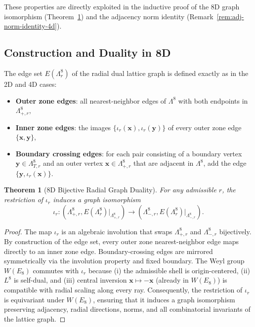 \documentclass{article}
\newtheorem{theorem}{Theorem}
\begin{document}
These properties are directly exploited in the inductive proof of the 8D graph isomorphism (Theorem~\ref{thm:8d-duality}) and the adjacency norm identity (Remark~\ref{rem:adj-norm-identity-4d}).

\subsection{Construction and Duality in 8D}
\label{subsec:8d-graph-construction-duality}
The edge set \(E(\Lambda_r^8)\) of the radial dual lattice graph is defined exactly as in the 2D and 4D cases:
\begin{itemize}
  \item \textbf{Outer zone edges}: all nearest-neighbor edges of \(\Lambda^8\) with both endpoints in \(\Lambda_{+,r}^8\),
  \item \textbf{Inner zone edges}: the images \(\{\iota_r(\mathbf{x}),\iota_r(\mathbf{y})\}\) of every outer zone edge \(\{\mathbf{x},\mathbf{y}\}\),
  \item \textbf{Boundary crossing edges}: for each pair consisting of a boundary vertex \(\mathbf{y} \in \Lambda_{T,r}^8\) and an outer vertex \(\mathbf{x}\in\Lambda_{+,r}^8\) that are adjacent in \(\Lambda^8\), add the edge \(\{\mathbf{y},\iota_r(\mathbf{x})\}\).
\end{itemize}

\begin{theorem}[8D Bijective Radial Graph Duality]
\label{thm:8d-duality}
For any admissible \(r\), the restriction of \(\iota_r\) induces a graph isomorphism
\[
\iota_r\colon(\Lambda_{+,r}^8,E(\Lambda_r^8)|_{\Lambda_{+,r}^8})\to(\Lambda_{-,r}^8,E(\Lambda_r^8)|_{\Lambda_{-,r}^8}).
\]
\end{theorem}
\begin{proof}
The map \(\iota_r\) is an algebraic involution that swaps \(\Lambda_{+,r}^8\) and \(\Lambda_{-,r}^8\) bijectively. By construction of the edge set, every outer zone nearest-neighbor edge maps directly to an inner zone edge. Boundary-crossing edges are mirrored symmetrically via the involution property and fixed boundary.
The Weyl group \(W(E_8)\) commutes with \(\iota_r\) because (i) the admissible shell is origin-centered, (ii) \(L^8\) is self-dual, and (iii) central inversion \(\mathbf{x}\mapsto -\mathbf{x}\) (already in \(W(E_8)\)) is compatible with radial scaling along every ray. Consequently, the restriction of \(\iota_r\) is equivariant under \(W(E_8)\), ensuring that it induces a graph isomorphism preserving adjacency, radial directions, norms, and all combinatorial invariants of the lattice graph.
\end{proof}
\end{document}
